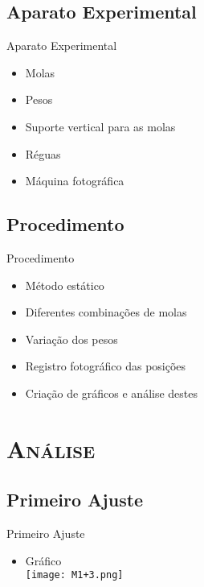 \documentclass[xcolor=x11names,compress]{beamer}
\renewcommand{\(}{\begin{columns}}
\renewcommand{\)}{\end{columns}}
\newcommand{\<}[1]{\begin{column}{#1}}
\renewcommand{\>}{\end{column}}
\begin{document}
\subsection{Aparato Experimental}

\begin{frame}{Aparato Experimental}
    \begin{itemize}
        \item Molas
        \item Pesos
        \item Suporte vertical para as molas
        \item Réguas
        \item Máquina fotográfica
    \end{itemize}
\end{frame}



\subsection{Procedimento}

\begin{frame}{Procedimento}
    \begin{itemize}
        \item Método estático
        \item Diferentes combinações de molas
        \item Variação dos pesos
        \item Registro fotográfico das posições
        \item Criação de gráficos e análise destes
    \end{itemize}
\end{frame}


\section{\scshape Análise}


\subsection{Primeiro Ajuste}

\begin{frame}{Primeiro Ajuste}
    \begin{itemize}
        \item Gráfico\\
            \texttt{[image: M1+3.png]}
    \end{itemize}
\end{frame}
\end{document}
